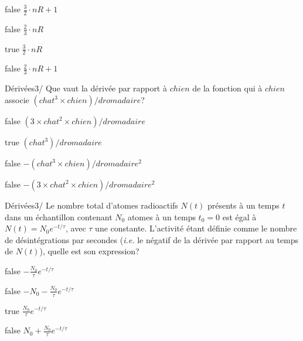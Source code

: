 \documentclass[11pt]{article}
\begin{document}
            \begin{reponses}
                \item[false] $\frac{3}{2}\cdot nR+1$
                \item[false] $\frac{2}{3}\cdot nR$
                \item[true] $\frac{3}{2}\cdot nR$
                \item[false] $\frac{2}{3}\cdot nR+1$
            \end{reponses}
        

            \begin{question}{22}{Dérivées}{3}{/}
                Que vaut la dérivée par rapport à $chien$ de la fonction qui à $chien$ associe $(chat^3\times chien)/dromadaire$?
            \end{question}

            \begin{reponses}
                \item[false] $(3 \times chat^2 \times chien)/dromadaire$
                \item[true] $(chat^3)/dromadaire$
                \item[false] $-(chat^3\times chien)/dromadaire^2$
                \item[false] $-(3 \times chat^2 \times chien)/dromadaire^2$
            \end{reponses}

            \begin{question}{22}{Dérivées}{3}{/}
                Le nombre total d'atomes radioactifs $N(t)$ présents à un temps $t$ dans un échantillon contenant $N_0$ atomes à un temps $t_0=0$ est égal à $N(t)=N_0e^{-t/\tau}$, avec $\tau$ une constante. L'activité étant définie comme le nombre de désintégrations par secondes (\textit{i.e.} le négatif de la dérivée par rapport au temps de $N(t)$), quelle est son expression?
            \end{question}

            \begin{reponses}
                \item[false] $-\frac{N_0}{\tau}e^{-t/\tau}$
                \item[false] $-N_0-\frac{N_0}{\tau}e^{-t/\tau}$
                \item[true] $\frac{N_0}{\tau}e^{-t/\tau}$
                \item[false] $N_0+\frac{N_0}{\tau}e^{-t/\tau}$
            \end{reponses}
            
\end{document}

